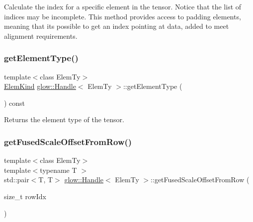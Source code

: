 Calculate the index for a specific element in the tensor. Notice that the list of indices may be incomplete. This method provides access to padding elements, meaning that it\textquotesingle{}s possible to get an index pointing at data, added to meet alignment requirements. \mbox{\label{classglow_1_1_handle_a2d71a692770a4dcb8654485d74965294}} 
\subsubsection{\texorpdfstring{get\+Element\+Type()}{getElementType()}}
{\footnotesize\ttfamily template$<$class Elem\+Ty$>$ \\
\hyperlink{namespaceglow_ab92e14a94329daf4083db670e95fbcdf}{Elem\+Kind} \hyperlink{classglow_1_1_handle}{glow\+::\+Handle}$<$ Elem\+Ty $>$\+::get\+Element\+Type (\begin{DoxyParamCaption}{ }\end{DoxyParamCaption}) const\hspace{0.3cm}{\ttfamily [inline]}}

\begin{DoxyReturn}{Returns}
the element type of the tensor. 
\end{DoxyReturn}
\mbox{\label{classglow_1_1_handle_ae8cf4cea87ecab8304875b1b609a6591}} 
\subsubsection{\texorpdfstring{get\+Fused\+Scale\+Offset\+From\+Row()}{getFusedScaleOffsetFromRow()}}
{\footnotesize\ttfamily template$<$class Elem\+Ty$>$ \\
template$<$typename T $>$ \\
std\+::pair$<$T, T$>$ \hyperlink{classglow_1_1_handle}{glow\+::\+Handle}$<$ Elem\+Ty $>$\+::get\+Fused\+Scale\+Offset\+From\+Row (\begin{DoxyParamCaption}\item[{size\+\_\+t}]{row\+Idx }\end{DoxyParamCaption})\hspace{0.3cm}{\ttfamily [inline]}}

